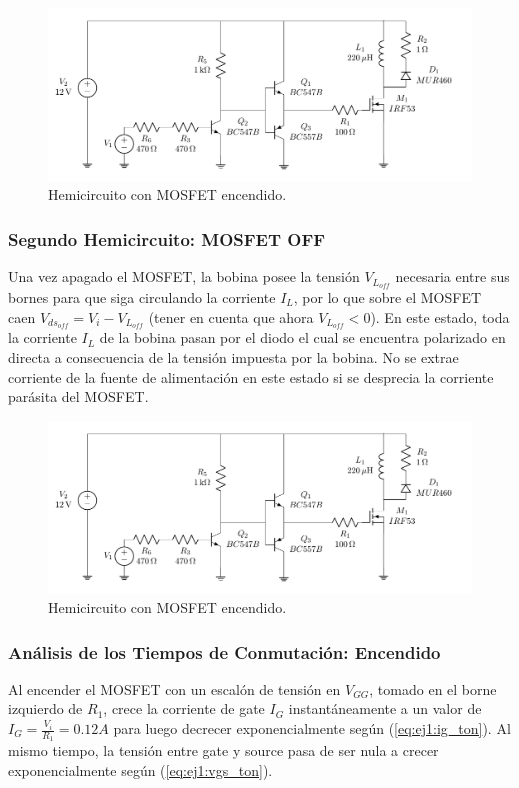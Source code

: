 \begin{figure}[H]
	\centering
	\includegraphics[width=0.4\linewidth, page=3]{ImagenesEjercicio-1/CircuitsEj1}
	\caption{Hemicircuito con MOSFET encendido.}
	\label{fig:ej1:circuito_on}
\end{figure}

\subsubsection{Segundo Hemicircuito: MOSFET OFF}

Una vez apagado el MOSFET, la bobina posee la tensión $V_{L_{off}}$ necesaria entre sus bornes para que siga circulando la corriente $I_L$, por lo que sobre el MOSFET caen $V_{ds_{off}} = V_i - V_{L_{off}}$ (tener en cuenta que ahora $V_{L_{off}} < 0$). En este estado, toda la corriente $I_L$ de la bobina pasan por el diodo el cual se encuentra polarizado en directa a consecuencia de la tensión impuesta por la bobina. No se extrae corriente de la fuente de alimentación en este estado si se desprecia la corriente parásita del MOSFET.

\begin{figure}[H]
	\centering
	\includegraphics[width=0.4\linewidth, page=2]{ImagenesEjercicio-1/CircuitsEj1}
	\caption{Hemicircuito con MOSFET encendido.}
	\label{fig:ej1:circuito_off}
\end{figure}

\subsubsection{Análisis de los Tiempos de Conmutación: Encendido}

Al encender el MOSFET con un escalón de tensión en $V_{GG}$, tomado en el borne izquierdo de $R_1$, crece la corriente de gate $I_G$ instantáneamente a un valor de $I_G = \frac{V_i}{R_1} = 0.12A$ para luego decrecer exponencialmente según (\ref{eq:ej1:ig_ton}). Al mismo tiempo, la tensión entre gate y source pasa de ser nula a crecer exponencialmente según (\ref{eq:ej1:vgs_ton}).

